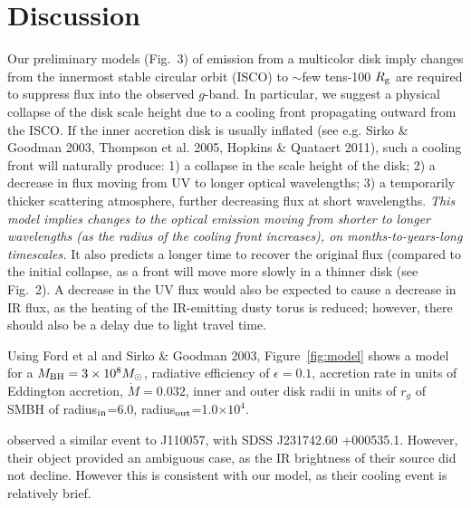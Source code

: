 \documentclass{nature}
\begin{document}
\section{Discussion}   %
Our preliminary models (Fig.~3) of emission from a multicolor disk
imply changes from the innermost stable circular orbit (ISCO) to
$\sim$few tens-100 $R_{\rm g}$ are required to suppress flux into the
observed $g$-band. In particular, we suggest a physical collapse of
the disk scale height due to a cooling front propagating outward from
the ISCO. If the inner accretion disk is usually inflated (see
e.g. Sirko \& Goodman 2003, Thompson et al. 2005, Hopkins \& Quataert
2011), such a cooling front will naturally produce: 1) a collapse in
the scale height of the disk; 2) a decrease in flux moving from UV to
longer optical wavelengths; 3) a temporarily thicker scattering
atmosphere, further decreasing flux at short wavelengths. {\it This
model implies changes to the optical emission moving from shorter to
longer wavelengths (as the radius of the cooling front increases), on
months-to-years-long timescales.} It also predicts a longer time to
recover the original flux (compared to the initial collapse, as a
front will move more slowly in a thinner disk (see Fig.~2). A decrease
in the UV flux would also be expected to cause a decrease in IR flux,
as the heating of the IR-emitting dusty torus is reduced; however,
there should also be a delay due to light travel time.

Using Ford et al and Sirko \& Goodman 2003, Figure~\ref{fig:model}
shows a model for a $M_{\rm BH}=3\times 10^{8} M_{\odot}$, radiative
efficiency of $\epsilon=0.1$, accretion rate in units of Eddington
accretion, $\dot{M}=0.032$, inner and outer disk radii in units of
$r_g$ of SMBH of radius$_{\rm in}$=6.0, radius$_{\rm out}$=1.0$\times
10^{4}$.

\cite{Guo16} observed a similar event to J110057, with SDSS
J231742.60 +000535.1. However, their object provided an ambiguous
case, as the IR brightness of their source did not decline. However
this is consistent with our model, as their cooling event is
relatively brief.










%
\end{document}
